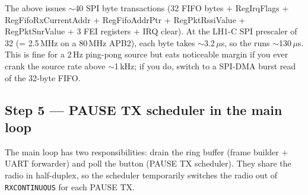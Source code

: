 \documentclass[11pt,letterpaper]{article}
\begin{document}
\begin{tcolorbox}[warning={ISR-side SPI traffic is a real budget}]
The \ISR{} above issues $\sim$40 SPI byte transactions (32 FIFO bytes + RegIrqFlags + RegFifoRxCurrentAddr + RegFifoAddrPtr + RegPktRssiValue + RegPktSnrValue + 3 FEI registers + IRQ clear). At the LH1-C SPI prescaler of 32 (= 2.5\,MHz on a 80\,MHz APB2), each byte takes $\sim$3.2\,$\mu$s, so the \ISR{} runs $\sim$130\,$\mu$s. This is fine for a 2\,Hz ping-pong source but eats noticeable margin if you ever crank the source rate above $\sim$1\,kHz; if you do, switch to a SPI-DMA burst read of the 32-byte FIFO.
\end{tcolorbox}

\subsection{Step 5 --- PAUSE TX scheduler in the main loop}

The main loop has two responsibilities: drain the ring buffer (frame builder + UART forwarder) and poll the button (PAUSE TX scheduler). They share the radio in half-duplex, so the scheduler temporarily switches the radio out of \texttt{RXCONTINUOUS} for each PAUSE TX.
\end{document}
